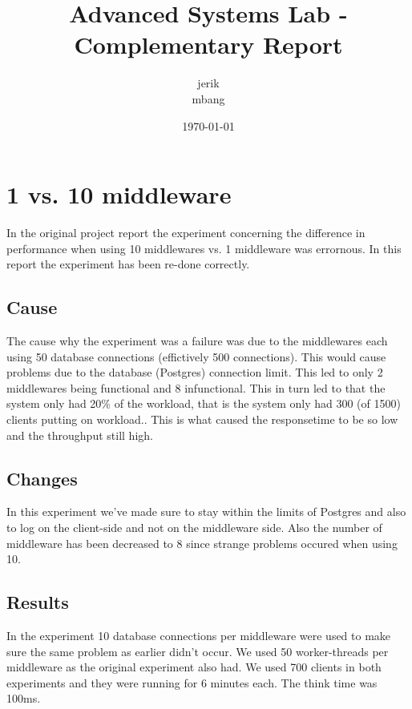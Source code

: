 \documentclass[a4paper, 11pt]{article}
\title{Advanced Systems Lab - Complementary Report}
\author{jerik\\mbang\\}
\date{\today}
\begin{document}
\maketitle

\section{1 vs. 10 middleware}
In the original project report the experiment concerning the difference in performance when using 10 middlewares vs. 1 middleware was errornous. In this report the experiment has been re-done correctly.

\subsection{Cause}
The cause why the experiment was a failure was due to the middlewares each using 50 database connections (effictively 500 connections). 
This would cause problems due to the database (Postgres) connection limit. 
This led to only 2 middlewares being functional and 8 infunctional. This in turn led to that the system only had 20\% of the workload, that is the system only had 300 (of 1500) clients putting on workload.. This is what caused the responsetime to be so low and the throughput still high.\\

\subsection{Changes}
In this experiment we've made sure to stay within the limits of Postgres and also to log on the client-side and not on the middleware side. Also the number of middleware has been decreased to 8 since strange problems occured when using 10.

\subsection{Results}
In the experiment 10 database connections per middleware were used to make sure the same problem as earlier didn't occur. We used 50 worker-threads per middleware as the original experiment also had. We used 700 clients in both experiments and they were running for 6 minutes each. The think time was 100ms.
\end{document}
